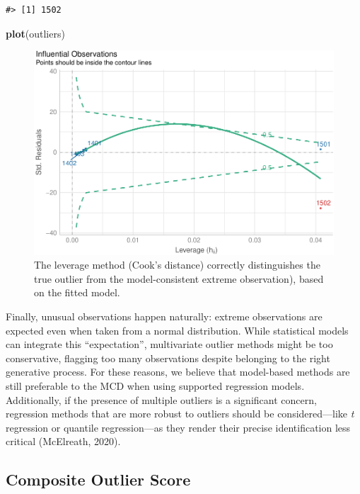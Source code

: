 \documentclass{article}
\newenvironment{Shaded}{\begin{snugshade}}{\end{snugshade}}
\newcommand{\FunctionTok}[1]{\textcolor[rgb]{0.13,0.29,0.53}{\textbf{#1}}}
\newcommand{\NormalTok}[1]{#1}
\begin{document}
\begin{verbatim}
#> [1] 1502
\end{verbatim}

\begin{Shaded}
\begin{Highlighting}[]
\FunctionTok{plot}\NormalTok{(outliers)}
\end{Highlighting}
\end{Shaded}

\begin{figure}
\includegraphics[width=1\linewidth]{paper_files/figure-latex/model3-1} \caption{The leverage method (Cook's distance) correctly distinguishes the true outlier from the model-consistent extreme observation), based on the fitted model.}\label{fig:model3}
\end{figure}

Finally, unusual observations happen naturally: extreme observations are
expected even when taken from a normal distribution. While statistical
models can integrate this ``expectation'', multivariate outlier methods
might be too conservative, flagging too many observations despite
belonging to the right generative process. For these reasons, we believe
that model-based methods are still preferable to the MCD when using
supported regression models. Additionally, if the presence of multiple
outliers is a significant concern, regression methods that are more
robust to outliers should be considered---like \emph{t} regression or
quantile regression---as they render their precise identification less
critical (McElreath, 2020).

\hypertarget{composite-outlier-score}{%
\subsection{Composite Outlier Score}\label{composite-outlier-score}}
\end{document}
